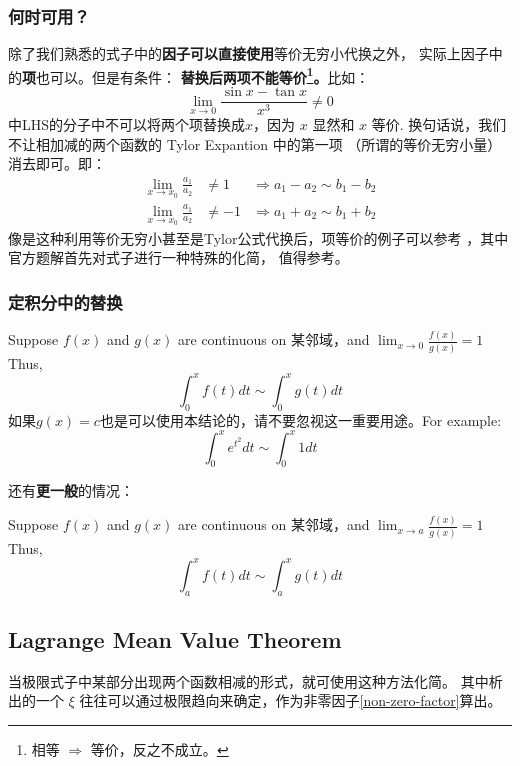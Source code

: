 \subsubsection{何时可用？}
除了我们熟悉的式子中的\textbf{因子可以直接使用}等价无穷小代换之外，
实际上因子中的\textbf{项}也可以。但是有条件：
\textbf{替换后两项不能等价\footnote{相等 $\Rightarrow$ 等价，反之不成立。}。}比如：
\[
    \lim_{x \to 0} \frac{\sin{x} - \tan{x} }{x^3} \neq 0
\]
中LHS的分子中不可以将两个项替换成$x$，因为 $x$ 显然和 $x$ 等价.
换句话说，我们不让相加减的两个函数的 Tylor Expantion 中的第一项
（所谓的等价无穷小量）消去即可。即：
\begin{align}
	\lim_{ x\to x_0 } \frac{a_1}{a_2} &\neq 1  &\Rightarrow a_1 - a_2 \sim b_1 - b_2 \\
	\lim_{ x\to x_0 } \frac{a_1}{a_2} &\neq -1 &\Rightarrow a_1 + a_2 \sim b_1 + b_2
\end{align}
像是这种利用等价无穷小甚至是Tylor公式代换后，项等价的例子可以参考
\cite[question 130]{w660}，其中官方题解首先对式子进行一种特殊的化简，
值得参考。

\subsubsection{定积分中的替换}
\label{limit-rerepresenting-in-variable-limits-integral}
Suppose $f(x)$ and $g(x)$ are continuous on 某邻域，and $\lim_{x \to 0} \frac{f(x)}{g(x)} = 1$
Thus, 
\begin{equation}
	\int_0^{x} f(t) dt \sim \int_0^{x} g(t) dt
\end{equation}
如果$g(x)=c$也是可以使用本结论的，请不要忽视这一重要用途。For example:
\[
\int_0^x e^{t^2} dt \sim \int_0^{x} 1 dt
\]

还有\textbf{更一般}的情况：
\begin{lemma}
	Suppose $f(x)$ and $g(x)$ are continuous on 某邻域，and $\lim_{x \to a} \frac{f(x)}{g(x)} = 1$ 
	Thus, 
	\begin{equation}
		\int_a^{x} f(t) dt \sim \int_a^{x} g(t) dt
	\end{equation}
\end{lemma}

\subsection{Lagrange Mean Value Theorem} \label{lagrange-limit}
当极限式子中某部分出现两个函数相减的形式，就可使用这种方法化简。
其中析出的一个 $\xi$ 往往可以通过极限趋向来确定，作为非零因子\ref{non-zero-factor}算出。

